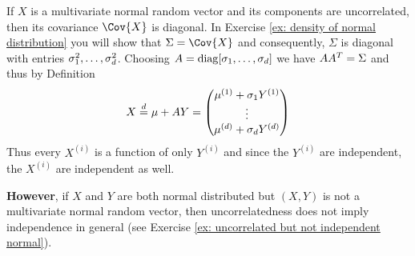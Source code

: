 \begin{remark}
    If \(X\) is a multivariate normal random vector and its components are
    uncorrelated, then its covariance \(\Cov{X}\) is diagonal.
    In Exercise \ref{ex: density of normal distribution} you will show
    that \(\Sigma = \Cov{X}\) and consequently, \(\Sigma\) is diagonal
    with entries \(\sigma_1^2, \ldots, \sigma_d^2\).
    Choosing \(A = \operatorname{diag}[\sigma_1, \ldots, \sigma_d]\)
    we have \(AA^T = \Sigma\) and thus by Definition
    \[
        X \overset{d}= \mu + A Y = \begin{pmatrix}
            \mu^{(1)} + \sigma_1 Y^{(1)} \\
            \vdots \\
            \mu^{(d)} + \sigma_d Y^{(d)}
        \end{pmatrix}
    \]
    Thus every \(X^{(i)}\) is a function of only \(Y^{(i)}\) and since the
    \(Y^{(i)}\) are independent, the \(X^{(i)}\) are independent as well.

    \textbf{However}, if \(X\) and \(Y\) are both normal distributed but
    \((X,Y)\) is not a multivariate normal random vector, then uncorrelatedness
    does not imply independence in general (see Exercise \ref{ex: uncorrelated
    but not independent normal}).
\end{remark}

